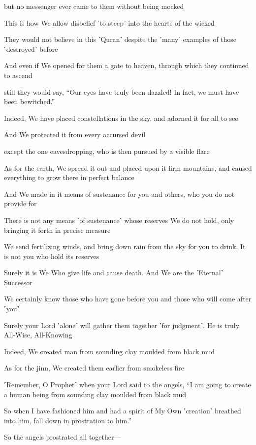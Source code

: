 but no messenger ever came to them without being mocked

This is how We allow disbelief ˹to steep˺ into the hearts of the wicked

They would not believe in this ˹Quran˺ despite the ˹many˺ examples of those ˹destroyed˺ before

And even if We opened for them a gate to heaven, through which they continued to ascend

still they would say, “Our eyes have truly been dazzled! In fact, we must have been bewitched.”

Indeed, We have placed constellations in the sky, and adorned it for all to see

And We protected it from every accursed devil

except the one eavesdropping, who is then pursued by a visible flare

As for the earth, We spread it out and placed upon it firm mountains, and caused everything to grow there in perfect balance

And We made in it means of sustenance for you and others, who you do not provide for

There is not any means ˹of sustenance˺ whose reserves We do not hold, only bringing it forth in precise measure

We send fertilizing winds, and bring down rain from the sky for you to drink. It is not you who hold its reserves

Surely it is We Who give life and cause death. And We are the ˹Eternal˺ Successor

We certainly know those who have gone before you and those who will come after ˹you˺

Surely your Lord ˹alone˺ will gather them together ˹for judgment˺. He is truly All-Wise, All-Knowing

Indeed, We created man from sounding clay moulded from black mud

As for the jinn, We created them earlier from smokeless fire

˹Remember, O Prophet˺ when your Lord said to the angels, “I am going to create a human being from sounding clay moulded from black mud

So when I have fashioned him and had a spirit of My Own ˹creation˺ breathed into him, fall down in prostration to him.”

So the angels prostrated all together—

